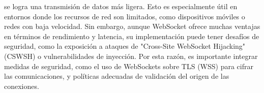             se logra una transmisi\'on de datos m\'as ligera. Esto es especialmente \'util en entornos donde los recursos de red 
            son limitados, como dispositivos m\'oviles o redes con baja velocidad. \cite{WebSocketEfficiency}
    \vskip 0.5cm
        Sin embargo, aunque WebSocket ofrece muchas ventajas en t\'erminos de rendimiento y latencia, su implementaci\'on 
            puede tener desaf\'ios de seguridad, como la exposici\'on a ataques de "Cross-Site WebSocket Hijacking" (CSWSH)
            o vulnerabilidades de inyecci\'on. Por esta raz\'on, es importante integrar medidas de seguridad, como el uso de 
            WebSockets sobre TLS (WSS) para cifrar las comunicaciones, y pol\'iticas adecuadas de validaci\'on del origen de 
            las conexiones. \cite{WebSocketSecurity}
    